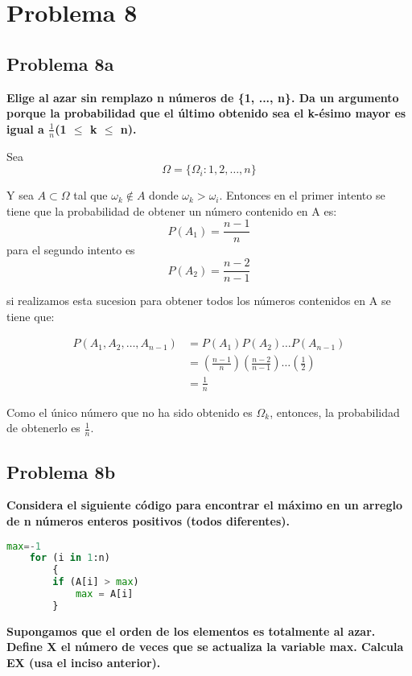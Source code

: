\section*{Problema 8}
\subsection*{Problema 8a}
\textbf{Elige al azar sin remplazo n números de \{1, ..., n\}. Da un argumento porque la probabilidad que el último obtenido sea el k-ésimo mayor es igual a $\frac{1}{n}$(1 $\leq$ k $\leq$ n).}

Sea
\begin{equation*}
    \Omega = \{ \Omega_i : 1,2,\dots,n \}
\end{equation*}

Y sea $A\subset \Omega$ tal que $\omega_k \notin A$ donde $\omega_k > \omega_i$. Entonces en el primer intento se tiene que la probabilidad de obtener un número contenido en A es:
\begin{equation*}
    P(A_1) = \frac{n-1}{n}
\end{equation*}
para el segundo intento es
\begin{equation*}
    P(A_2) = \frac{n-2}{n-1}
\end{equation*}

si realizamos esta sucesion para obtener todos los números contenidos en A se tiene que:

\begin{align*}
    P(A_1,A_2,\dots,A_{n-1}) & = P(A_1)P(A_2)\dots P(A_{n-1})                                                          \\
                             & = \left(\frac{n-1}{n}\right)\left(\frac{n-2}{n-1}\right) \dots \left(\frac{1}{2}\right) \\
                             & = \frac{1}{n}
\end{align*}


Como el único número que no ha sido obtenido es $\Omega_k$, entonces, la probabilidad de obtenerlo es $\frac{1}{n}$.
\subsection*{Problema 8b}
\textbf{Considera el siguiente código para encontrar el máximo en un arreglo
    de n números enteros positivos (todos diferentes).}
\begin{lstlisting}[language=python]
    max=-1
    for (i in 1:n)
        {
        if (A[i] > max)
            max = A[i]
        }
\end{lstlisting}
\textbf{Supongamos que el orden de los elementos es totalmente al azar. Define X el número de veces que se actualiza la variable max. Calcula EX (usa el inciso anterior).}